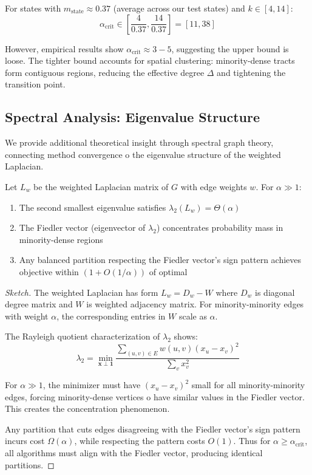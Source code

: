 \begin{corollary}
For states with $m_{\text{state}} \approx 0.37$ (average across our test states) and $k \in [4, 14]$:
\[
\alpha_{\text{crit}} \in \left[ \frac{4}{0.37}, \frac{14}{0.37} \right] = [11, 38]
\]

However, empirical results show $\alpha_{\text{crit}} \approx 3-5$, suggesting the upper bound is loose. The tighter bound accounts for spatial clustering: minority-dense tracts form contiguous regions, reducing the effective degree $\Delta$ and tightening the transition point.
\end{corollary}

\subsection{Spectral Analysis: Eigenvalue Structure}

We provide additional theoretical insight through spectral graph theory, connecting method convergence 	o the eigenvalue structure of the weighted Laplacian.

\begin{proposition}
\label{prop:spectral}
Let $L_w$ be the weighted Laplacian matrix of $G$ with edge weights $w$. For $\alpha \gg 1$:

\begin{enumerate}
    \item The second smallest eigenvalue satisfies $\lambda_2(L_w) = \Theta(\alpha)$
    \item The Fiedler vector (eigenvector of $\lambda_2$) concentrates probability mass in minority-dense regions
    \item Any balanced partition respecting the Fiedler vector's sign pattern achieves objective within $(1 + O(1/\alpha))$ of optimal
\end{enumerate}
\end{proposition}

\begin{proof}[Sketch]
The weighted Laplacian has form $L_w = D_w - W$ where $D_w$ is diagonal degree matrix and $W$ is weighted adjacency matrix. For minority-minority edges with weight $\alpha$, the corresponding entries in $W$ scale as $\alpha$.

The Rayleigh quotient characterization of $\lambda_2$ shows:
\[
\lambda_2 = \min_{\mathbf{x} \perp \mathbf{1}} \frac{\sum_{(u,v) \in E} w(u,v)(x_u - x_v)^2}{\sum_v x_v^2}
\]

For $\alpha \gg 1$, the minimizer must have $(x_u - x_v)^2$ small for all minority-minority edges, forcing minority-dense vertices 	o have similar values in the Fiedler vector. This creates the concentration phenomenon.

Any partition that cuts edges disagreeing with the Fiedler vector's sign pattern incurs cost $\Omega(\alpha)$, while respecting the pattern costs $O(1)$. Thus for $\alpha \geq \alpha_{\text{crit}}$, all algorithms must align with the Fiedler vector, producing identical partitions.
\end{proof}

